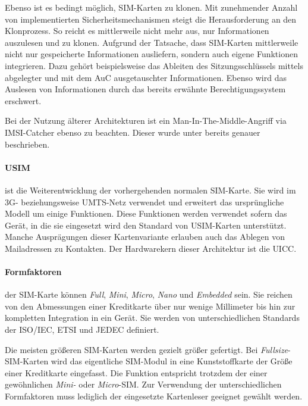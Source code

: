 Ebenso ist es bedingt möglich, SIM-Karten zu klonen. Mit zunehmender Anzahl von implementierten
Sicherheitsmechanismen steigt die Herausforderung an den Klonprozess. So reicht es mittlerweile
nicht mehr aus, nur Informationen auszulesen und zu klonen.
Aufgrund der Tatsache, dass SIM-Karten mittlerweile nicht nur gespeicherte Informationen %
ausliefern, sondern auch eigene Funktionen integrieren.
Dazu gehört beispielsweise das Ableiten des Sitzungsschlüssels
mittels abgelegter und mit dem \ac{AuC} ausgetauschter Informationen. Ebenso wird das Auslesen
von Informationen durch das bereits erwähnte Berechtigungssystem erschwert.

Bei der Nutzung älterer Architekturen ist ein Man-In-The-Middle-Angriff via IMSI-Catcher ebenso
zu beachten. Dieser wurde unter  bereits genauer beschrieben.

\paragraph{\ac{USIM}} ist die Weiterentwicklung der vorhergehenden normalen \ac{SIM}-Karte. Sie wird
im 3G- beziehungsweise UMTS-Netz verwendet und erweitert das ursprüngliche Modell um einige Funktionen.
Diese Funktionen werden verwendet sofern das Gerät, in die sie eingesetzt wird den Standard
von USIM-Karten unterstützt. Manche Ausprägungen dieser Kartenvariante erlauben auch das Ablegen
von Mailadressen zu Kontakten. Der Hardwarekern dieser Architektur ist die \ac{UICC}.

\paragraph{Formfaktoren} der SIM-Karte können \textit{Full}, \textit{Mini}, \textit{Micro},
\textit{Nano} und \textit{Embedded} sein. Sie reichen von den Abmessungen einer Kreditkarte über
nur wenige Millimeter bis hin zur kompletten Integration in ein Gerät. Sie werden von unterschiedlichen
Standards der ISO/IEC, ETSI und JEDEC definiert.

Die meisten größeren SIM-Karten werden gezielt größer gefertigt. Bei \textit{Fullsize}-SIM-Karten
wird das eigentliche SIM-Modul in eine Kunststoffkarte der Größe einer Kreditkarte eingefasst.
Die Funktion entspricht trotzdem der einer gewöhnlichen \textit{Mini-} oder \textit{Micro}-SIM.
Zur Verwendung der unterschiedlichen Formfaktoren muss lediglich der eingesetzte Kartenleser
geeignet gewählt werden.

